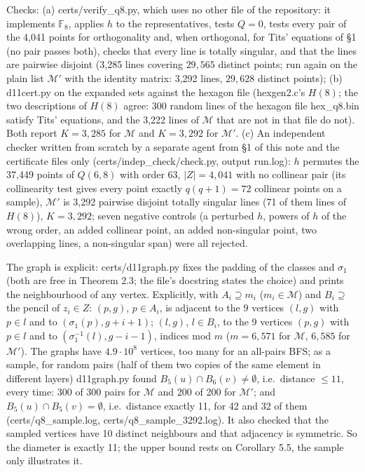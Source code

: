 \documentclass[
  10pt,
]{article}
\begin{document}
Checks: (a) certs/verify\_q8.py, which uses no other file of the
repository: it implements \(\mathbb F_8\), applies \(h\) to the
representatives, tests \(Q = 0\), tests every pair of the 4,041 points
for orthogonality and, when orthogonal, for Tits' equations of §1 (no
pair passes both), checks that every line is totally singular, and that
the lines are pairwise disjoint (3,285 lines covering \(29{,}565\)
distinct points; run again on the plain list \(\mathcal M'\) with the
identity matrix: 3,292 lines, \(29{,}628\) distinct points); (b)
d11cert.py on the expanded sets against the hexagon file (hexgen2.c's
\(H(8)\); the two descriptions of \(H(8)\) agree: 300 random lines of
the hexagon file hex\_q8.bin satisfy Tits' equations, and the 3,222
lines of \(\mathcal M\) that are not in that file do not). Both report
\(K = 3{,}285\) for \(\mathcal M\) and \(K = 3{,}292\) for
\(\mathcal M'\). (c) An independent checker written from scratch by a
separate agent from §1 of this note and the certificate files only
(certs/indep\_check/check.py, output run.log): \(h\) permutes the 37,449
points of \(Q(6,8)\) with order 63, \(|Z| = 4{,}041\) with no collinear
pair (its collinearity test gives every point exactly \(q(q+1) = 72\)
collinear points on a sample), \(\mathcal M'\) is 3,292 pairwise
disjoint totally singular lines (71 of them lines of \(H(8)\)),
\(K = 3{,}292\); seven negative controls (a perturbed \(h\), powers of
\(h\) of the wrong order, an added collinear point, an added
non-singular point, two overlapping lines, a non-singular span) were all
rejected.

The graph is explicit: certs/d11graph.py fixes the padding of the
classes and \(\sigma_1\) (both are free in Theorem 2.3; the file's
docstring states the choice) and prints the neighbourhood of any vertex.
Explicitly, with \(A_i\supseteq m_i\) (\(m_i\in\mathcal M\)) and
\(B_i\supseteq\) the pencil of \(z_i\in Z\): \((p,g)\), \(p\in A_i\), is
adjacent to the 9 vertices \((l,g)\) with \(p\in l\) and to
\((\sigma_1(p), g+i+1)\); \((l,g)\), \(l\in B_i\), to the 9 vertices
\((p,g)\) with \(p\in l\) and to \((\sigma_1^{-1}(l), g-i-1)\), indices
mod \(m\) (\(m = 6{,}571\) for \(\mathcal M\), \(6{,}585\) for
\(\mathcal M'\)). The graphs have \(4.9\cdot10^8\) vertices, too many
for an all-pairs BFS; as a sample, for random pairs (half of them two
copies of the same element in different layers) d11graph.py found
\(B_5(u)\cap B_6(v)\ne\emptyset\), i.e.~distance \(\le 11\), every time:
300 of 300 pairs for \(\mathcal M\) and 200 of 200 for \(\mathcal M'\);
and \(B_5(u)\cap B_5(v)=\emptyset\), i.e.~distance exactly 11, for 42
and 32 of them (certs/q8\_sample.log, certs/q8\_sample\_3292.log). It
also checked that the sampled vertices have 10 distinct neighbours and
that adjacency is symmetric. So the diameter is exactly 11; the upper
bound rests on Corollary 5.5, the sample only illustrates it.
\end{document}
